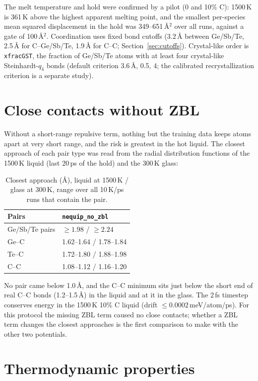 \documentclass[11pt]{article}
\newcommand{\nozbl}{\texttt{nequip\_no\_zbl}}
\begin{document}
The melt temperature and hold were confirmed by a pilot (0 and 10\% C): 1500\,K is 361\,K above the highest apparent
melting point, and the smallest per-species mean squared displacement in the hold was 349--651\,\AA$^2$ over all runs,
against a gate of 100\,\AA$^2$. Coordination uses fixed bond cutoffs (3.2\,\AA{} between Ge/Sb/Te, 2.5\,\AA{} for
C--Ge/Sb/Te, 1.9\,\AA{} for C--C; Section~\ref{sec:cutoffs}). Crystal-like order is \texttt{xfracGST}, the fraction of
Ge/Sb/Te atoms with at least four crystal-like Steinhardt-$q_4$ bonds (default criterion 3.6\,\AA, 0.5, 4; the calibrated recrystallization criterion is a separate study).

\section{Close contacts without ZBL}
Without a short-range repulsive term, nothing but the training data keeps atoms apart at very short range, and the
risk is greatest in the hot liquid. The closest approach of each pair type was read from the radial distribution
functions of the 1500\,K liquid (last 20\,ps of the hold) and the 300\,K glass:

\begin{table}[H]
\centering
\caption{Closest approach (\AA), liquid at 1500\,K / glass at 300\,K, range over all 10\,K/ps runs that contain the pair.}
\begin{tabular}{ll}
\toprule
Pairs & \nozbl{} \\
\midrule
Ge/Sb/Te pairs & $\geq 1.98$ / $\geq 2.24$ \\
Ge--C & 1.62--1.64 / 1.78--1.84 \\
Te--C & 1.72--1.80 / 1.88--1.98 \\
C--C & 1.08--1.12 / 1.16--1.20 \\
\bottomrule
\end{tabular}
\end{table}

No pair came below 1.0\,\AA, and the C--C minimum sits just below the short end of real C--C bonds (1.2--1.5\,\AA)
in the liquid and at it in the glass. The 2\,fs timestep conserves energy in the 1500\,K 10\%
C liquid (drift $\leq 0.0002$\,meV/atom/ps). For this protocol the missing ZBL term caused no
close contacts; whether a ZBL term changes the closest approaches is the first comparison to make with the other two
potentials.

\section{Thermodynamic properties}
\end{document}
